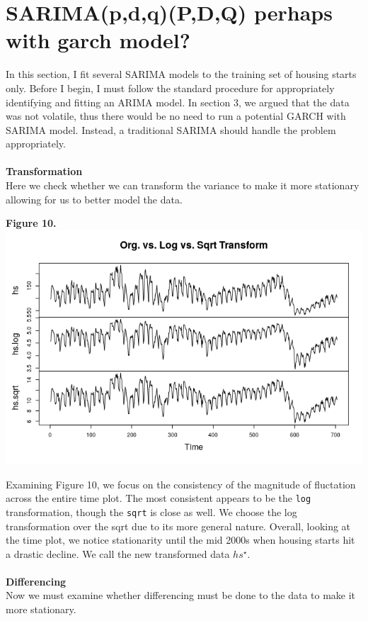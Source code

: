 \documentclass[11pt]{article}
\begin{document}
\section{SARIMA(p,d,q)(P,D,Q) perhaps with garch model?}
In this section, I fit several SARIMA models to the training set of housing starts only. Before I begin, I must follow the standard procedure for appropriately identifying and fitting an ARIMA model. In section 3, we argued that the data was not volatile, thus there would be no need to run a potential GARCH with SARIMA model. Instead, a traditional SARIMA should handle the problem appropriately.
\\\\
\textbf{Transformation}
\\
Here we check whether we can transform the variance to make it more stationary allowing for us to better model the data.
\begin{center}
\textbf{Figure 10.}
\\
\includegraphics[scale=1]{trans}
\end{center}
Examining Figure 10, we focus on the consistency of the magnitude of fluctation across the entire time plot. The most consistent appears to be the {\tt log} transformation, though the {\tt sqrt} is close as well. We choose the log transformation over the sqrt due to its more general nature. Overall, looking at the time plot, we notice stationarity until the mid 2000s when housing starts hit a drastic decline. We call the new transformed data $hs^{\star}$. 
\\\\
\textbf{Differencing}
\\
Now we must examine whether differencing must be done to the data to make it more stationary.
\end{document}
